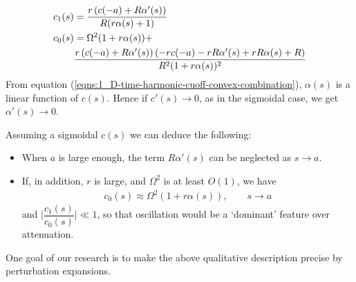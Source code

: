 \documentclass[12pt,twoside]{report}
\begin{document}
\begin{subequations}
\begin{align}
c_1(s) &= \dfrac{r \left(c(-a)+R \alpha '(s)\right)}{R(r \alpha (s)+1)} \\
c_0(s)&= \Omega ^2  (1 + r \alpha(s)) + \\
&\dfrac{r \left(c(-a)+R \alpha '(s)\right) \left(-r c(-a)-r R
   \alpha '(s)+r R \alpha (s)+R\right)}{R^2(1+r  \alpha
   (s))^2}   \notag
\end{align}
\end{subequations}
From equation (\ref{eqns:1_D-time-harmonic-cuoff-convex-combination}), $\alpha(s)$ is a linear function of $c(s)$. Hence if $c'(s) \rightarrow 0$, as in the sigmoidal case, we get $\alpha'(s) \rightarrow 0$. 

Assuming a sigmoidal $c(s)$ we can deduce the following:
\begin{itemize}
\item When $a$ is large enough, the term $R \alpha'(s)$ can be neglected as $s \rightarrow a$. 
\item If, in addition, $r$ is large, and $\Omega^2$ is at least $O(1)$, we have 
\begin{align}
c_0(s)\approx \Omega ^2  (1 + r \alpha(s)), \qquad s \rightarrow a
\end{align}
and $\Big \vert \dfrac{c_1(s)}{c_0(s)} \Big \vert \ll 1 $, so that oscillation would be a `dominant' feature over attenuation. 
\end{itemize}
One goal of our research is to make the above qualitative description precise by perturbation expansions. 
\end{document}
